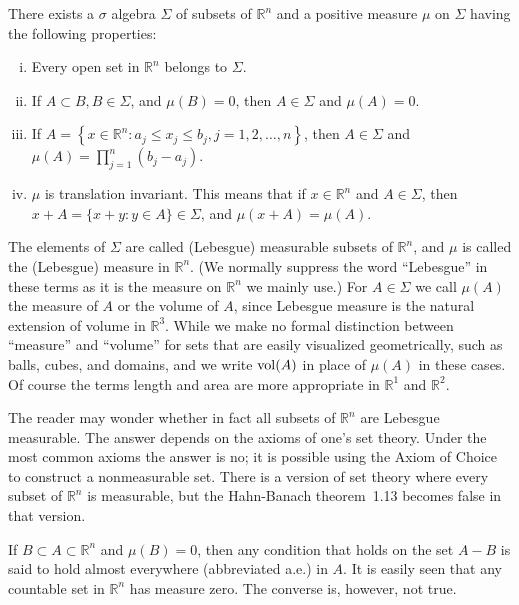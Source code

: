 \begin{theorem}
  There exists a $\sigma$ algebra $\Sigma$ of subsets of $\mathbb{R}^n$
  and a positive measure $\mu$ on $\Sigma$ having the following properties:
  \begin{enumerate}[(i)]
    \item Every open set in $\mathbb{R}^n$ belongs to $\Sigma$.
    \item If $A \subset B, B \in \Sigma$, and $\mu(B)=0$, then $A \in \Sigma$ and $\mu(A)=0$.
    \item If $A=\left\{x \in \mathbb{R}^n: a_j \leq x_j \leq b_j, j=1,2, \ldots, n\right\}$, 
      then $A \in \Sigma$ and $\mu(A)=\prod_{j=1}^n\left(b_j-a_j\right)$.
    \item $\mu$ is translation invariant. This means that if $x \in \mathbb{R}^n$
      and $A \in \Sigma$, then $x+A=\{x+y: y \in A\} \in \Sigma$, and $\mu(x+A)=\mu(A)$.
  \end{enumerate}
\end{theorem}

The elements of $\Sigma$ are called (Lebesgue) measurable subsets of $\mathbb{R}^n$,
and $\mu$ is called the (Lebesgue) measure in $\mathbb{R}^n$.
(We normally suppress the word ``Lebesgue'' in these terms
as it is the measure on $\mathbb{R}^n$ we mainly use.)
For $A \in \Sigma$ we call $\mu(A)$ the measure of $A$ or the volume of $A$,
since Lebesgue measure is the natural extension of volume in $\mathbb{R}^3$.
While we make no formal distinction between ``measure'' and ``volume'' for sets that are easily 
visualized geometrically, such as balls, cubes, and domains,
and we write $\operatorname{vol}(A)$ in place of $\mu(A)$ in these cases. Of course the terms length and area 
are more appropriate in $\mathbb{R}^1$ and $\mathbb{R}^2$.

The reader may wonder whether in fact all subsets of $\mathbb{R}^n$ are Lebesgue measurable.
The answer depends on the axioms of one's set theory.
Under the most common axioms the answer is no;
it is possible using the Axiom of Choice to construct a nonmeasurable set.
There is a version of set theory where every subset of $\mathbb{R}^n$ is measurable, but the Hahn-Banach theorem~1.13 becomes false in that version.

\begin{para}
  If $B \subset A \subset \mathbb{R}^n$ and $\mu(B)=0$, then any condition that holds on the set 
  $A-B$ is said to hold almost everywhere (abbreviated a.e.) in $A$. It is easily seen that any 
  countable set in $\mathbb{R}^n$ has measure zero. The converse is, however, not true.
\end{para}

